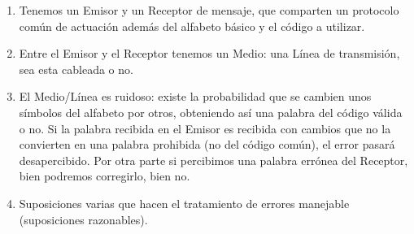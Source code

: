 \documentclass[
]{article}
\begin{document}
\begin{enumerate}
\begin{enumerate}
    \begin{enumerate}
    \def\labelenumiii{\arabic{enumiii}.}
    \item
      Tenemos un Emisor y un Receptor de mensaje, que comparten un
      protocolo común de actuación además del alfabeto básico y el
      código a utilizar.
    \item
      Entre el Emisor y el Receptor tenemos un Medio: una Línea de
      transmisión, sea esta cableada o no.
    \item
      El Medio/Línea es ruidoso: existe la probabilidad que se cambien
      unos símbolos del alfabeto por otros, obteniendo así una palabra
      del código válida o no. Si la palabra re\-cibida en el Emisor es
      recibida con cambios que no la convierten en una palabra prohibida
      (no del código común), el error pasará desapercibido. Por otra
      parte si per\-cibimos una palabra errónea del Receptor, bien
      podremos corregirlo, bien no.
    \item
      Suposiciones varias que hacen el tratamiento de errores manejable
      (suposiciones ra\-zonables).


\end{enumerate}
\end{enumerate}
\end{enumerate}
\end{document}
